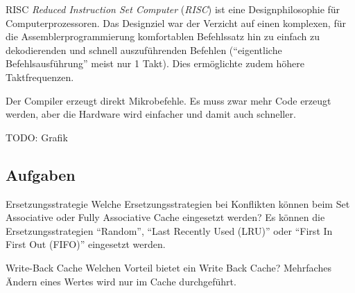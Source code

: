 \begin{defi}[Befehlssatzarchitektur]{RISC}
    \emph{Reduced Instruction Set Computer} (\emph{RISC}) ist eine Designphilosophie für Computerprozessoren.
    Das Designziel war der Verzicht auf einen komplexen, 
    für die Assemblerprogrammierung komfortablen Befehlssatz hin zu einfach zu dekodierenden und schnell auszuführenden Befehlen (\enquote{eigentliche Befehlsausführung} meist nur 1 Takt).
    Dies ermöglichte zudem höhere Taktfrequenzen.
    
    Der Compiler erzeugt direkt Mikrobefehle.
    Es muss zwar mehr Code erzeugt werden, aber die Hardware wird einfacher und damit auch schneller.
    
    TODO: Grafik
\end{defi}

\subsection{Aufgaben}

\begin{aufgabe}[Caches]{Ersetzungsstrategie}
    Welche Ersetzungsstrategien bei Konflikten können beim Set Associative oder Fully Associative Cache eingesetzt werden?
    \tcblower
    Es können die Ersetzungsstrategien \enquote{Random},
    \enquote{Last Recently Used (LRU)} oder \enquote{First In First Out (FIFO)} eingesetzt werden.
\end{aufgabe}

\begin{aufgabe}[Caches]{Write-Back Cache}
    Welchen Vorteil bietet ein Write Back Cache?
    \tcblower
    Mehrfaches Ändern eines Wertes wird nur im Cache durchgeführt.
\end{aufgabe}

